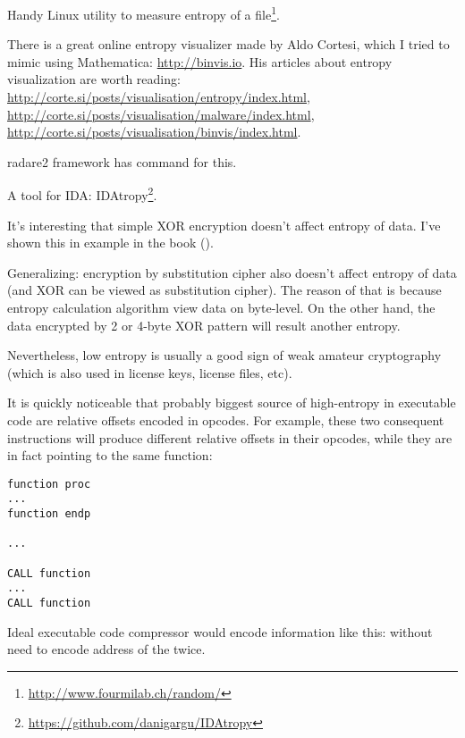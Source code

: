 
Handy Linux  utility to measure entropy of a file\footnote{\url{http://www.fourmilab.ch/random/}}.

There is a great online entropy visualizer made by Aldo Cortesi, 
which I tried to mimic using Mathematica: \url{http://binvis.io}.
His articles about entropy visualization are worth reading:
\url{http://corte.si/posts/visualisation/entropy/index.html},
\url{http://corte.si/posts/visualisation/malware/index.html},
\url{http://corte.si/posts/visualisation/binvis/index.html}.

radare2 framework has  command for this.

A tool for IDA: IDAtropy\footnote{\url{https://github.com/danigargu/IDAtropy}}.


It's interesting that simple XOR encryption doesn't affect entropy of data.
I've shown this in  example in the book ().

Generalizing: encryption by substitution cipher also doesn't affect entropy of data (and XOR can be viewed as substitution cipher).
The reason of that is because entropy calculation algorithm view data on byte-level.
On the other hand, the data encrypted by 2 or 4-byte XOR pattern will result another entropy.

Nevertheless, low entropy is usually a good sign of weak amateur cryptography
(which is also used in license keys, license files, etc).


It is quickly noticeable that probably biggest source of high-entropy in executable code are relative offsets encoded in opcodes.
For example, these two consequent instructions will produce different relative offsets in their opcodes, 
while they are in fact pointing to the same function:

\begin{lstlisting}
function proc
...
function endp

...

CALL function
...
CALL function
\end{lstlisting}

Ideal executable code compressor would encode information like this:
 without need to encode
address of the  twice.

